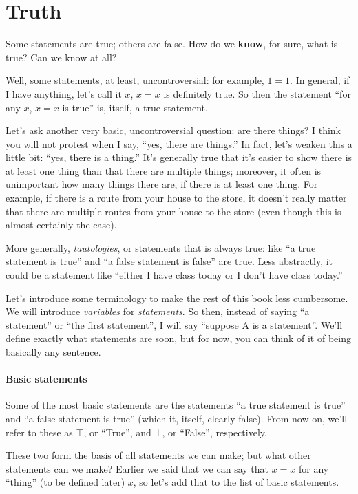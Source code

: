 \section{Truth}

Some statements are true; others are false.
How do we \textbf{know}, for sure, what is true?
Can we know at all?

Well, some statements, at least, uncontroversial: for example, $1 = 1$.
In general, if I have anything, let's call it $x$, $x = x$ is definitely true.
So then the statement ``for any $x$, $x = x$ is true'' is, itself, a true statement.

Let's ask another very basic, uncontroversial question: are there things?
I think you will not protest when I say, ``yes, there are things.''
In fact, let's weaken this a little bit: ``yes, there is a thing.''
It's generally true that it's easier to show there is at least one thing than that there are multiple things; moreover, it often is unimportant how many things there are, if there is at least one thing.
For example, if there is a route from your house to the store, it doesn't really matter that there are multiple routes from your house to the store (even though this is almost certainly the case).

More generally, \emph{tautologies}, or statements that is always true: like ``a true statement is true'' and ``a false statement is false'' are true.
Less abstractly, it could be a statement like ``either I have class today or I don't have class today.''

Let's introduce some terminology to make the rest of this book less cumbersome.
We will introduce \emph{variables} for \emph{statements}.
So then, instead of saying ``a statement'' or ``the first statement'', I will say ``suppose A is a statement''.
We'll define exactly what statements are soon, but for now, you can think of it of being basically any sentence.

\paragraph{Basic statements}

Some of the most basic statements are the statements ``a true statement is true'' and ``a false statement is true'' (which it, itself, clearly false).
From now on, we'll refer to these as $\top$, or ``True'', and $\bot$, or ``False'', respectively.

These two form the basis of all statements we can make; but what other statements can we make?
Earlier we said that we can say that $x = x$ for any ``thing'' (to be defined later) $x$, so let's add that to the list of basic statements.

